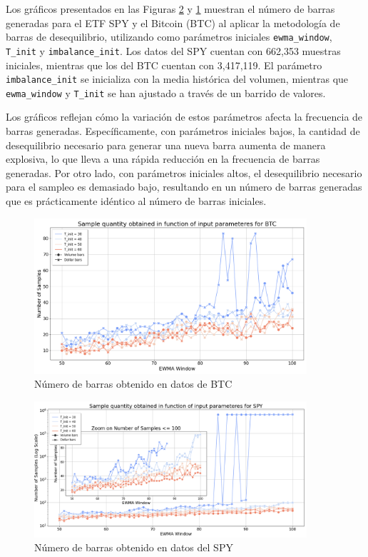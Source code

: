 \documentclass[a4paper,12pt, twoside]{report}
\begin{document}
Los gráficos presentados en las Figuras \ref{fig:barrido-spy} y \ref{fig:barrido-btc} muestran el número de barras 
generadas para el ETF SPY y el Bitcoin (BTC) al aplicar la metodología de barras de desequilibrio, utilizando como 
parámetros iniciales \texttt{ewma\_window}, \texttt{T\_init} y \texttt{imbalance\_init}. Los datos del SPY cuentan 
con 662,353 muestras iniciales, mientras que los del BTC cuentan con 3,417,119. El parámetro \texttt{imbalance\_init} 
se inicializa con la media histórica del volumen, mientras que \texttt{ewma\_window} y \texttt{T\_init} se han ajustado 
a través de un barrido de valores. 

Los gráficos reflejan cómo la variación de estos parámetros afecta la frecuencia de barras 
generadas. Específicamente, con parámetros iniciales bajos, la cantidad de desequilibrio necesario para generar una 
nueva barra aumenta de manera explosiva, lo que lleva a una rápida reducción en la frecuencia de barras generadas. 
Por otro lado, con parámetros iniciales altos, el desequilibrio necesario para el sampleo es demasiado bajo, 
resultando en un número de barras generadas que es prácticamente idéntico al número de barras iniciales. 


\begin{figure}[H]
    \centering
    \includegraphics[width=0.9\textwidth]{./figures/barrido_parametros_imbalance_btc.png}
    \caption{Número de barras obtenido en datos de BTC}
    \label{fig:barrido-btc}
\end{figure}

\begin{figure}[H]
    \centering
    \includegraphics[width=0.9\textwidth]{./figures/barrido_parametros_imbalance_spy.png}
    \caption{Número de barras obtenido en datos del SPY}
    \label{fig:barrido-spy}
\end{figure}
\end{document}
